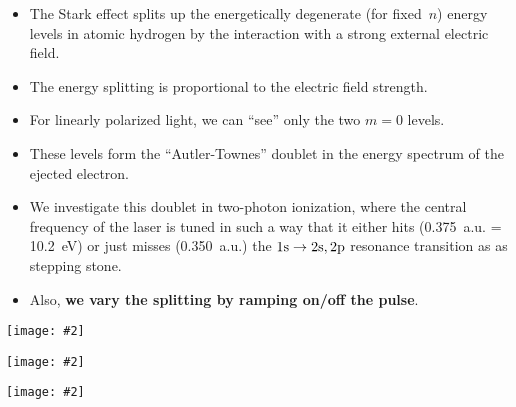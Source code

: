 \documentclass[landscape,a0b,final]{a0poster}
\newenvironment{poster}{
  \begin{center}
  \begin{minipage}[c]{0.98\textwidth}
}{
  \end{minipage} 
  \end{center}
}
\newcommand{\pbox}[4]{
\psshadowbox[#3]{
\begin{minipage}[t][#2][t]{#1}
#4
\end{minipage}
}}
\newcommand{\myfig}[3][0]{
\begin{center}
  \vspace{1.5cm}
  \texttt{[image: \#2]}
  \nobreak\medskip
\end{center}}
\begin{document}
\begin{poster}
\begin{multicols}{3}
\begin{itemize}
\item The Stark effect splits up the energetically degenerate (for fixed~$n$) energy levels in atomic
      hydrogen by the interaction with a strong external electric field.
\item The energy splitting is proportional to the electric field strength.
\item For linearly polarized light, we can ``see'' only the two $m=0$ levels.
\item These levels form the ``Autler-Townes'' doublet in the energy spectrum
      of the ejected electron.
\item We investigate this doublet in two-photon ionization, where the central frequency
      of the laser is tuned in such a way that it either hits (0.375~a.u. = 10.2~eV) or just misses
      (0.350~a.u.) the $\rm 1s \to 2s,2p$ resonance transition as as stepping stone. 
\item Also, {\bf\color{newgreen} we vary the splitting by ramping on/off the pulse}. 
\end{itemize} 
\begin{center}
\myfig{Stark.eps}{.60}
\end{center}

\vfill 
\columnbreak


\vspace{1cm}\begin{center}\pbox{0.8\columnwidth}{}{linewidth=2mm,framearc=0.1,linecolor=lightblue,fillstyle=gradient,
                          gradangle=0,gradbegin=whiteblue,gradend=whiteblue,gradmidpoint=1.0,framesep=1em}{\begin{center}{\Large\bf Plots}\end{center}}\end{center}\vspace{1.25cm}


  \setlength{\columnsep}{0pt}
  \setlength{\columnseprule}{0pt}
  \hspace{-2cm}
  \begin{multicols}{2}
  \begin{center}
  \myfig{c_spectrum_350_2_36_2_highin.ps}{1.0}
  \end{center}

  \begin{center}
  \myfig{c_spectrum_350_2_36_2_lowin.ps}{1.0}
  \end{center}
  \end{multicols}


\end{multicols}
\end{poster}
\end{document}
